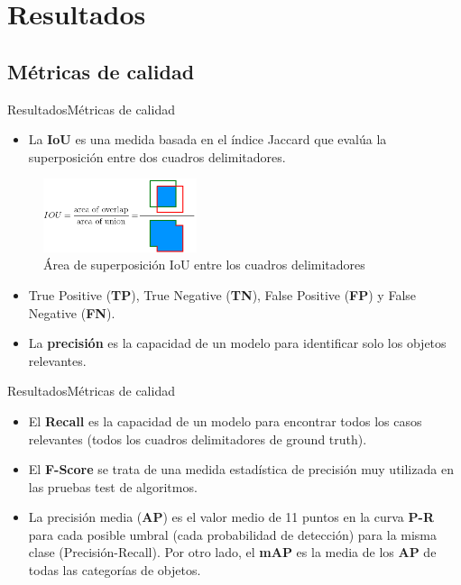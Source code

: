 \section{Resultados}

\subsection{Métricas de calidad}

\begin{frame}{Resultados}{Métricas de calidad}

\begin{itemize}
    \justifying
    \item La \textbf{IoU} es una medida basada en el índice Jaccard que evalúa la superposición entre dos cuadros delimitadores.
\end{itemize}

    \begin{figure}[ht]
    \centering
    \includegraphics[width=0.4\textwidth]{Images/resultados/metricas/iou.png}
    \caption{\label{fig:iou}Área de superposición IoU entre los cuadros delimitadores}
    \end{figure}
    
\begin{itemize}
    \justifying
    \item True Positive (\textbf{TP}), True Negative (\textbf{TN}), False Positive (\textbf{FP}) y False Negative (\textbf{FN}).
    \item La \textbf{precisión} es la capacidad de un modelo para identificar solo los objetos relevantes.
\end{itemize}

\end{frame}


\begin{frame}{Resultados}{Métricas de calidad}

\begin{itemize}
    \justifying
    \setlength\itemsep{1em}
    \item El \textbf{Recall} es la capacidad de un modelo para encontrar todos los casos relevantes (todos los cuadros delimitadores de ground truth).
    \item El \textbf{F-Score} se trata de una medida estadística de precisión muy utilizada en las pruebas test de algoritmos.
    \item La precisión media (\textbf{AP}) es el valor medio de 11 puntos en la curva \textbf{P-R} para cada posible umbral (cada probabilidad de detección) para la misma clase (Precisión-Recall). Por otro lado, el \textbf{mAP} es la media de los \textbf{AP} de todas las categorías de objetos.
\end{itemize}

\end{frame}

